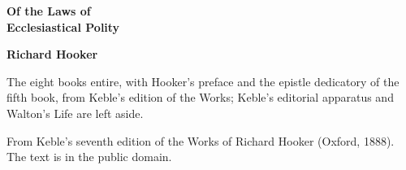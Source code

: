 \documentclass[11pt,letterpaper]{article}
\begin{document}
\color{ink}

\begin{titlepage}
\centering
\vspace*{4em}
{\LARGE\bfseries\color{heading} Of the Laws of\\[0.3em]Ecclesiastical Polity\par}
\vspace{2em}
{\Large\bfseries\color{heading} Richard Hooker\par}
\vspace{2.5em}
{\itshape\color{subhead}\parbox{0.8\linewidth}{\centering The eight books entire, with Hooker's preface and the epistle dedicatory of the fifth book, from Keble's edition of the Works; Keble's editorial apparatus and Walton's Life are left aside.\par}}
\vfill
{\small From Keble's seventh edition of the Works of Richard Hooker (Oxford, 1888). The text is in the public domain.\par}
\vspace{2em}
\end{titlepage}

\tableofcontents


\end{document}
